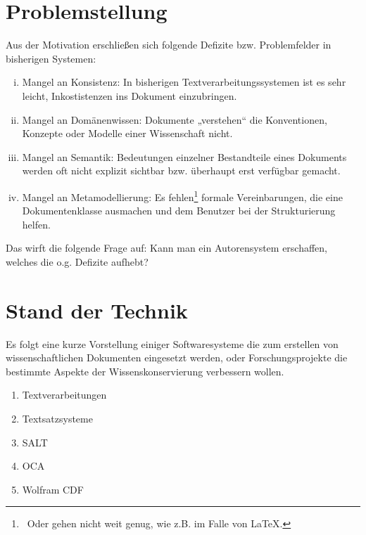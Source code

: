  
\section{Problemstellung}\label{problemstellung}
 
Aus der Motivation erschließen sich folgende Defizite bzw. Problemfelder in bisherigen Systemen:

 
\begin{enumerate}[(i)]

\item
Mangel an Konsistenz: In bisherigen Textverarbeitungssystemen ist es sehr leicht, Inkostistenzen ins Dokument einzubringen.


\item
Mangel an Domänenwissen: Dokumente „verstehen“ die Konventionen, Konzepte oder Modelle einer Wissenschaft nicht.


\item
Mangel an Semantik: Bedeutungen einzelner Bestandteile eines Dokuments werden oft nicht explizit sichtbar bzw. überhaupt erst verfügbar gemacht.


\item
Mangel an Metamodellierung: Es fehlen\footnote{~Oder gehen nicht weit genug, wie z.B. im Falle von LaTeX.} formale Vereinbarungen, die eine Dokumentenklasse ausmachen und dem Benutzer bei der Strukturierung helfen.


\end{enumerate}
 
Das wirft die folgende Frage auf: Kann man ein Autorensystem erschaffen, welches die o.g. Defizite aufhebt?

 
\section{Stand der Technik}\label{stand-der-technik}
 
Es folgt eine kurze Vorstellung einiger Softwaresysteme die zum erstellen von wissenschaftlichen Dokumenten eingesetzt werden, oder Forschungsprojekte die bestimmte Aspekte der Wissenskonservierung verbessern wollen.

 
\begin{enumerate}

\item Textverarbeitungen
\item Textsatzsysteme
\item SALT
\item OCA
\item Wolfram CDF
\end{enumerate}
 
